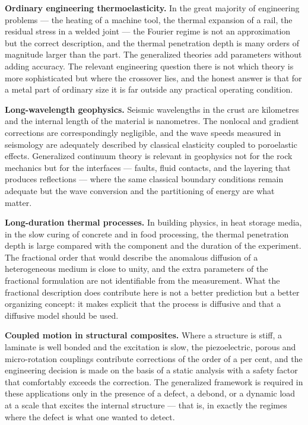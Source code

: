 \textbf{Ordinary engineering thermoelasticity.} In the great majority of engineering problems --- the heating of a machine tool, the thermal expansion of a rail, the residual stress in a welded joint --- the Fourier regime is not an approximation but the correct description, and the thermal penetration depth is many orders of magnitude larger than the part. The generalized theories add parameters without adding accuracy. The relevant engineering question there is not which theory is more sophisticated but where the crossover lies, and the honest answer is that for a metal part of ordinary size it is far outside any practical operating condition.

\textbf{Long-wavelength geophysics.} Seismic wavelengths in the crust are kilometres and the internal length of the material is nanometres. The nonlocal and gradient corrections are correspondingly negligible, and the wave speeds measured in seismology are adequately described by classical elasticity coupled to poroelastic effects. Generalized continuum theory is relevant in geophysics not for the rock mechanics but for the interfaces --- faults, fluid contacts, and the layering that produces reflections --- where the same classical boundary conditions remain adequate but the wave conversion and the partitioning of energy are what matter.

\textbf{Long-duration thermal processes.} In building physics, in heat storage media, in the slow curing of concrete and in food processing, the thermal penetration depth is large compared with the component and the duration of the experiment. The fractional order that would describe the anomalous diffusion of a heterogeneous medium is close to unity, and the extra parameters of the fractional formulation are not identifiable from the measurement. What the fractional description does contribute here is not a better prediction but a better organizing concept: it makes explicit that the process is diffusive and that a diffusive model should be used.

\textbf{Coupled motion in structural composites.} Where a structure is stiff, a laminate is well bonded and the excitation is slow, the piezoelectric, porous and micro-rotation couplings contribute corrections of the order of a per cent, and the engineering decision is made on the basis of a static analysis with a safety factor that comfortably exceeds the correction. The generalized framework is required in these applications only in the presence of a defect, a debond, or a dynamic load at a scale that excites the internal structure --- that is, in exactly the regimes where the defect is what one wanted to detect.

